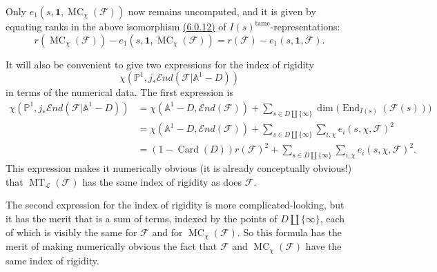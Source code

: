 Only \(e_1(s,\mathbf{1},\operatorname{MC}_\chi(\mathcal{F}))\) now remains uncomputed, and it is given by equating ranks in the above isomorphism \hyperref[par:6.0.12]{(6.0.12)} of \(I(s)^{\mathrm{tame}}\)-representations:
\[
r(\operatorname{MC}_\chi(\mathcal{F}))-e_1(s,\mathbf{1},\operatorname{MC}_\chi(\mathcal{F}))
=r(\mathcal{F})-e_1(s,\mathbf{1},\mathcal{F}).
\]

It will also be convenient to give two expressions for the index of rigidity
\[
\chi(\mathbb{P}^1,j_*\mathcal{E}nd(\mathcal{F}\vert\mathbb{A}^1-D))
\]
in terms of the numerical data. The first expression is
\[
\begin{aligned}
\chi(\mathbb{P}^1,j_*\mathcal{E}nd(\mathcal{F}\vert\mathbb{A}^1-D))
&=\chi(\mathbb{A}^1-D,\mathcal{E}nd(\mathcal{F}))
 +\sum_{s\in D\amalg\{\infty\}}\dim\bigl(\operatorname{End}_{I(s)}(\mathcal{F}(s))\bigr)\\
&=\chi(\mathbb{A}^1-D,\mathcal{E}nd(\mathcal{F}))
 +\sum_{s\in D\amalg\{\infty\}}\sum_{i,\chi} e_i(s,\chi,\mathcal{F})^2\\
&=(1-\operatorname{Card}(D))r(\mathcal{F})^2
 +\sum_{s\in D\amalg\{\infty\}}\sum_{i,\chi} e_i(s,\chi,\mathcal{F})^2.
\end{aligned}
\]
This expression makes it numerically obvious (it is already conceptually obvious!) that \(\operatorname{MT}_{\mathcal{L}}(\mathcal{F})\) has the same index of rigidity as does \(\mathcal{F}\).

The second expression for the index of rigidity is more complicated-looking, but it has the merit that is a sum of terms, indexed by the points of \(D\amalg\{\infty\}\), each of which is visibly the same for \(\mathcal{F}\) and for \(\operatorname{MC}_\chi(\mathcal{F})\). So this formula has the merit of making numerically obvious the fact that \(\mathcal{F}\) and \(\operatorname{MC}_\chi(\mathcal{F})\) have the same index of rigidity.

